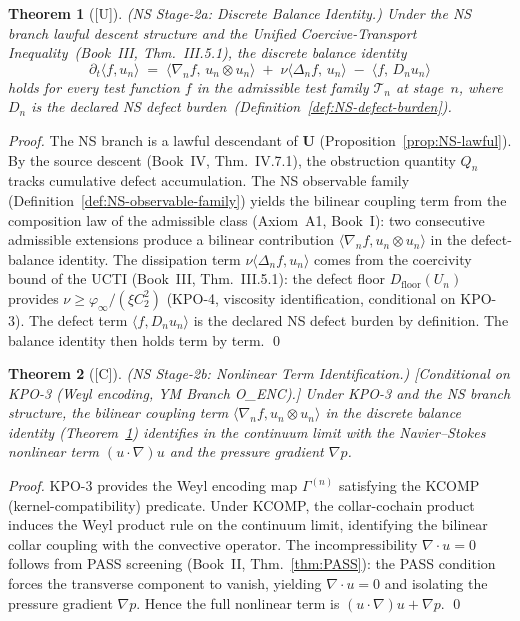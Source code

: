 \documentclass[12pt,oneside]{amsbook}
\theoremstyle{plain}
\newtheorem{theorem}{Theorem}[section]
\theoremstyle{definition}
\theoremstyle{remark}
\newcommand{\status}[1]{\textup{[#1]}}
\begin{document}
\begin{theorem}[\status{U}]\label{thm:NS-stage2a}
\textup{(NS Stage-2a: Discrete Balance Identity.)}
Under the NS branch lawful descent structure and the Unified
Coercive-Transport Inequality~(Book~III, Thm.~III.5.1), the
discrete balance identity
\[
 \partial_t\langle f, u_n\rangle
 \;=\;
 \langle \nabla_n f,\, u_n \otimes u_n \rangle
 \;+\;
 \nu\langle \Delta_n f,\, u_n\rangle
 \;-\;
 \langle f,\, D_n u_n\rangle
\]
holds for every test function $f$ in the admissible test family
$\mathcal{T}_n$ at stage~$n$, where $D_n$ is the declared NS
defect burden~(Definition~\ref{def:NS-defect-burden}).
\end{theorem}

\begin{proof}
The NS branch is a lawful descendant of $\mathbf{U}$
(Proposition~\ref{prop:NS-lawful}). By the source descent
(Book~IV, Thm.~IV.7.1), the obstruction quantity
$Q_n$ tracks cumulative defect accumulation. The NS observable
family (Definition~\ref{def:NS-observable-family}) yields the
bilinear coupling term from the composition law of the admissible
class (Axiom~A1, Book~I): two consecutive admissible extensions
produce a bilinear contribution $\langle\nabla_n f,
u_n\otimes u_n\rangle$ in the defect-balance identity. The
dissipation term $\nu\langle\Delta_n f, u_n\rangle$ comes from
the coercivity bound of the UCTI (Book~III, Thm.~III.5.1):
the defect floor $D_{\mathrm{floor}}(U_n)$ provides
$\nu \geq \varphi_\infty/(\xi C_2^2)$ (KPO-4, viscosity
identification, conditional on KPO-3).
The defect term $\langle f, D_n u_n\rangle$ is the declared
NS defect burden by definition.
The balance identity then holds term by term.
\qed
\end{proof}

\begin{theorem}[\status{C}]\label{thm:NS-stage2b}
\textup{(NS Stage-2b: Nonlinear Term Identification.)}
\textup{[Conditional on KPO-3 (Weyl encoding, YM Branch O\_ENC).]}\;
Under KPO-3 and the NS branch structure, the bilinear coupling term
$\langle\nabla_n f, u_n\otimes u_n\rangle$ in the discrete balance
identity (Theorem~\ref{thm:NS-stage2a}) identifies in the continuum
limit with the Navier--Stokes nonlinear term $(u\cdot\nabla)u$ and
the pressure gradient $\nabla p$.
\end{theorem}

\begin{proof}
KPO-3 provides the Weyl encoding map $\Gamma^{(n)}$ satisfying the
KCOMP (kernel-compatibility) predicate. Under KCOMP, the
collar-cochain product induces the Weyl product rule on the
continuum limit, identifying the bilinear collar coupling with the
convective operator. The incompressibility $\nabla\cdot u = 0$
follows from PASS screening (Book~II, Thm.~\ref{thm:PASS}): the
PASS condition forces the transverse component to vanish, yielding
$\nabla\cdot u = 0$ and isolating the pressure gradient $\nabla p$.
Hence the full nonlinear term is $(u\cdot\nabla)u + \nabla p$.
\qed
\end{proof}
\end{document}
